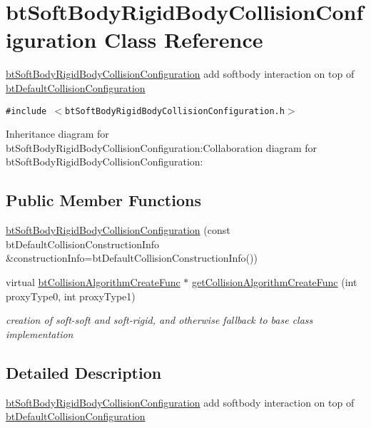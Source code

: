 \hypertarget{classbt_soft_body_rigid_body_collision_configuration}{
\section{btSoftBodyRigidBodyCollisionConfiguration Class Reference}
\label{classbt_soft_body_rigid_body_collision_configuration}
}
\hyperlink{classbt_soft_body_rigid_body_collision_configuration}{btSoftBodyRigidBodyCollisionConfiguration} add softbody interaction on top of \hyperlink{classbt_default_collision_configuration}{btDefaultCollisionConfiguration}  


{\tt \#include $<$btSoftBodyRigidBodyCollisionConfiguration.h$>$}

Inheritance diagram for btSoftBodyRigidBodyCollisionConfiguration:Collaboration diagram for btSoftBodyRigidBodyCollisionConfiguration:\subsection*{Public Member Functions}
\begin{CompactItemize}
\item 
\hyperlink{classbt_soft_body_rigid_body_collision_configuration_ed032b3ffc351d036e28b503d3cdc801}{btSoftBodyRigidBodyCollisionConfiguration} (const btDefaultCollisionConstructionInfo \&constructionInfo=btDefaultCollisionConstructionInfo())
\item 
virtual \hyperlink{structbt_collision_algorithm_create_func}{btCollisionAlgorithmCreateFunc} $\ast$ \hyperlink{classbt_soft_body_rigid_body_collision_configuration_81be88bc433469b4703fc0fb9d504a50}{getCollisionAlgorithmCreateFunc} (int proxyType0, int proxyType1)
\begin{CompactList}\small\item\em creation of soft-soft and soft-rigid, and otherwise fallback to base class implementation \item\end{CompactList}\end{CompactItemize}


\subsection{Detailed Description}
\hyperlink{classbt_soft_body_rigid_body_collision_configuration}{btSoftBodyRigidBodyCollisionConfiguration} add softbody interaction on top of \hyperlink{classbt_default_collision_configuration}{btDefaultCollisionConfiguration} 

